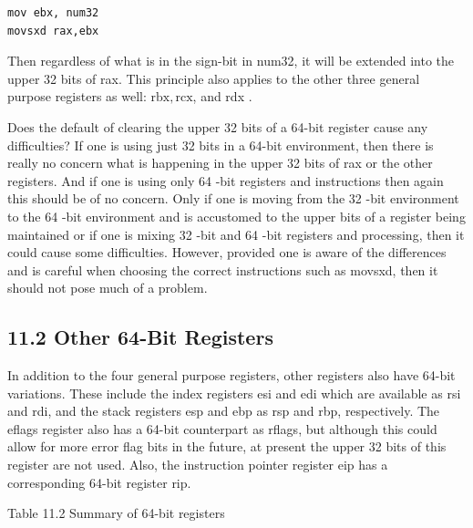 \documentclass[10pt]{book}
\begin{document}
\begin{center}
\begin{center}
\begin{center}
\begin{center}
\begin{verbatim}
mov ebx, num32
movsxd rax,ebx
\end{verbatim}

Then regardless of what is in the sign-bit in num32, it will be extended into the upper 32 bits of rax. This principle also applies to the other three general purpose registers as well: $\mathrm{rbx}, \mathrm{rcx}$, and rdx .

Does the default of clearing the upper 32 bits of a 64-bit register cause any difficulties? If one is using just 32 bits in a 64-bit environment, then there is really no concern what is happening in the upper 32 bits of rax or the other registers. And if one is using only 64 -bit registers and instructions then again this should be of no concern. Only if one is moving from the 32 -bit environment to the 64 -bit environment and is accustomed to the upper bits of a register being maintained or if one is mixing 32 -bit and 64 -bit registers and processing, then it could cause some difficulties. However, provided one is aware of the differences and is careful when choosing the correct instructions such as movsxd, then it should not pose much of a problem.

\subsection*{11.2 Other 64-Bit Registers}
In addition to the four general purpose registers, other registers also have 64-bit variations. These include the index registers esi and edi which are available as rsi and rdi, and the stack registers esp and ebp as rsp and rbp, respectively. The eflags register also has a 64-bit counterpart as rflags, but although this could allow for more error flag bits in the future, at present the upper 32 bits of this register are not used. Also, the instruction pointer register eip has a corresponding 64-bit register rip.

Table 11.2 Summary of 64-bit registers



\end{center}
\end{center}
\end{center}
\end{center}
\end{document}
